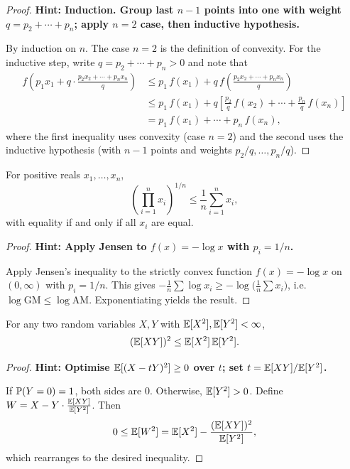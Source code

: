 \documentclass[a4paper]{article}
\begin{document}
\begin{proof}
  \textbf{Hint: Induction. Group last $n-1$ points into one with weight $q = p_2 + \dotsb + p_n$; apply $n = 2$ case, then inductive hypothesis.}

  By induction on $n$. The case $n = 2$ is the definition of convexity. For the inductive step, write $q = p_2 + \cdots + p_n > 0$ and note that
  \begin{align*}
    f(p_1 x_1 + q \cdot \tfrac{p_2 x_2 + \cdots + p_n x_n}{q}) &\leq p_1\, f(x_1) + q\, f\!\left(\frac{p_2 x_2 + \cdots + p_n x_n}{q}\right)\\
    &\leq p_1\, f(x_1) + q\left[\frac{p_2}{q}\, f(x_2) + \cdots + \frac{p_n}{q}\, f(x_n)\right]\\
    &= p_1\, f(x_1) + \cdots + p_n\, f(x_n),
  \end{align*}
  where the first inequality uses convexity (case $n = 2$) and the second uses the inductive hypothesis (with $n - 1$ points and weights $p_2/q, \dotsc, p_n/q$).
\end{proof}

\begin{cor}[AM-GM inequality]
  For positive reals $x_1, \dotsc, x_n$,
  \[
    \left(\prod_{i=1}^{n} x_i\right)^{1/n} \leq \frac{1}{n}\sum_{i=1}^{n} x_i,
  \]
  with equality if and only if all $x_i$ are equal.
\end{cor}

\begin{proof}
  \textbf{Hint: Apply Jensen to $f(x) = -\log x$ with $p_i = 1/n$.}

  Apply Jensen's inequality to the strictly convex function $f(x) = -\log x$ on $(0, \infty)$ with $p_i = 1/n$. This gives $-\frac{1}{n}\sum \log x_i \geq -\log\bigl(\frac{1}{n}\sum x_i\bigr)$, i.e.\ $\log\mathrm{GM} \leq \log\mathrm{AM}$. Exponentiating yields the result.
\end{proof}

\begin{thm}
  For any two random variables $X, Y$ with $\E[X^2], \E[Y^2] < \infty$,
  \[
    (\E[XY])^2 \leq \E[X^2]\,\E[Y^2].
  \]
\end{thm}

\begin{proof}
  \textbf{Hint: Optimise $\E[(X - tY)^2] \geq 0$ over $t$; set $t = \E[XY]/\E[Y^2]$.}

  If $\P(Y = 0) = 1$, both sides are $0$. Otherwise, $\E[Y^2] > 0$. Define $W = X - Y\cdot \frac{\E[XY]}{\E[Y^2]}$. Then
  \[
    0 \leq \E[W^2] = \E[X^2] - \frac{(\E[XY])^2}{\E[Y^2]},
  \]
  which rearranges to the desired inequality.
\end{proof}
\end{document}
